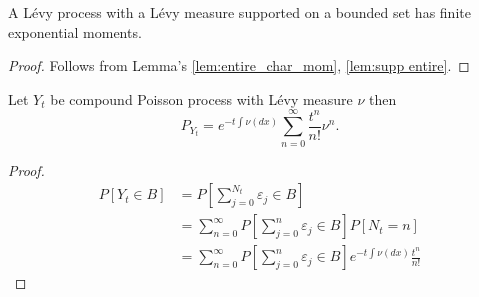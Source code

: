 \documentclass[a4paper,11pt]{article}
\begin{document}
\begin{corollary} \label{cor:finite_moments}
    A L\'{e}vy process with a L\'{e}vy measure supported on a bounded set has finite exponential moments.
\end{corollary}

\begin{proof}
    Follows from Lemma's \ref{lem:entire_char_mom}, \ref{lem:supp entire}.
\end{proof}

\begin{theorem} \label{th:compound_poisson expansion}
    Let $Y_{t}$ be compound Poisson process with Lévy measure $\nu$ then
    \begin{equation}
        P_{Y_{t}}= e^{-t\int \nu(dx) }\sum_{n=0}^{\infty}  \frac{t^{n}}{n !} \nu^{n}.
    \end{equation}
\end{theorem}
\begin{proof}
    \begin{align}
        P[Y_{t} \in B] & = P \left[ \sum_{j=0}^{N_{t}} \varepsilon_{j} \in B \right]                                                     \\
                       & = \sum_{n=0}^{\infty} P \left[ \sum_{j=0}^{n} \varepsilon_{j} \in B \right] P[N_{t}=n]                          \\
                       & = \sum_{n=0}^{\infty} P \left[ \sum_{j=0}^{n} \varepsilon_{j} \in B \right]e^{-t\int \nu(dx) }\frac{t^{n}}{n !}
    \end{align}
\end{proof}
\end{document}
